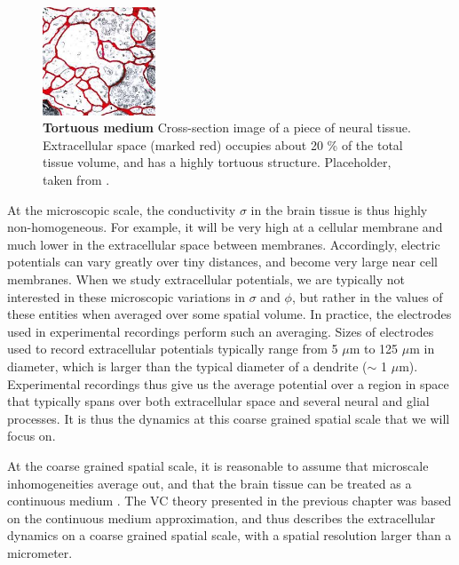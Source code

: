 \begin{figure}[!ht]
\begin{center}
\includegraphics[width=0.3\textwidth]{Figures/Sigma/ECSdummy.jpeg}
\end{center}
\caption{\textbf{Tortuous medium}  Cross-section image of a piece of neural tissue. Extracellular space (marked red) occupies about 20 \% of the total tissue volume, and has a highly tortuous structure. Placeholder, taken from \citep{Sykova2008}.
}
\label{Sigma:fig:ECS}
\end{figure}

At the microscopic scale, the conductivity  $\sigma$ in the brain tissue is thus highly non-homogeneous. For example, it will be very high at a cellular membrane and much lower in the extracellular space between membranes. Accordingly, electric potentials can vary greatly over tiny distances, and become very large near cell membranes. When we study extracellular potentials, we are typically not interested in these microscopic variations in $\sigma$ and $\phi$, but rather in the values of these entities when averaged over some spatial volume. In practice, the electrodes used in experimental recordings perform such an averaging. Sizes of electrodes used to record extracellular potentials typically range from 5 $\mu$m to 125 $\mu$m in diameter\citep{Viswam2019}, which is larger than the typical diameter of a dendrite ($\sim$ 1 $\mu$m). Experimental recordings thus give us the average potential over a region in space that typically spans over both extracellular space and several neural and glial processes. It is thus the dynamics at this coarse grained spatial scale that we will focus on.

At the coarse grained spatial scale, it is reasonable to assume that microscale inhomogeneities average out, and that the brain tissue can be treated as a continuous medium \citep{Gratiy2017}. The VC theory presented in the previous chapter was based on the continuous medium approximation, and thus describes the extracellular dynamics on a coarse grained spatial scale, with a spatial resolution larger than a micrometer. 

